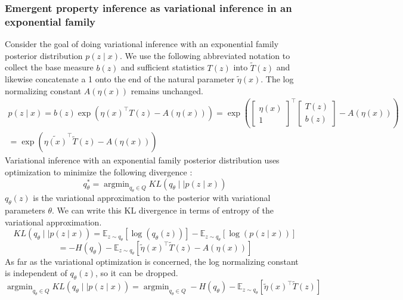 \documentclass[11pt]{article}
\DeclareMathOperator*{\argmin}{argmin}
\begin{document}
\subsubsection{Emergent property inference as variational inference in an exponential family}\label{methods_VI}
Consider the goal of doing variational inference with an exponential family posterior distribution $p(z \mid x)$.  We use the following abbreviated notation to collect the base measure $b(z)$ and sufficient statistics $T(z)$ into $\tilde{T}(z)$ and likewise concatenate a 1 onto the end of the natural parameter $\tilde{\eta}(x)$.  The log normalizing constant $A(\eta(x))$ remains unchanged.
\begin{equation}
\begin{split}
p(z \mid x) = b(z) \exp{\left( \eta(x)^\top T(z) - A(\eta(x)) \right)} = \exp{\left( \begin{bmatrix} \eta(x) \\ 1 \end{bmatrix}^\top \begin{bmatrix} T(z) \\ b(z) \end{bmatrix} - A(\eta(x)) \right)} \\= \exp{\left(\tilde{\eta(x)}^\top \tilde{T}(z) - A(\eta(x)) \right)} 
\end{split}
\end{equation}
Variational inference with an exponential family posterior distribution uses optimization to minimize the following divergence \cite{blei2017variational}:
\begin{equation}
q_\theta^* = \argmin_{q_\theta \in Q} KL(q_\theta \mid \mid p(z \mid x))
\end{equation}
$q_\theta(z)$ is the variational approximation to the posterior with variational parameters $\theta$.  We can write this KL divergence in terms of entropy of the variational approximation.
\begin{equation}
KL(q_\theta \mid \mid p(z \mid x)) = \mathbb{E}_{z \sim q_\theta} \left[ \log (q_\theta(z)) \right] - \mathbb{E}_{z \sim q_\theta} \left[ \log (p(z \mid x)) \right]
\end{equation}
\begin{equation}
 = -H(q_\theta) - \mathbb{E}_{z \sim q_\theta} \left[ \tilde{\eta}(x)^\top  \tilde{T}(z) - A(\eta(x)) \right]
\end{equation}
As far as the variational optimization is concerned, the log normalizing constant is independent of $q_\theta(z)$, so it can be dropped. 
\begin{equation}
\argmin_{q_\theta \in Q} KL(q_\theta \mid \mid p(z \mid x)) =  \argmin_{q_\theta \in Q} -H(q_\theta) - \mathbb{E}_{z \sim q_\theta} \left[ \tilde{\eta}(x)^\top  \tilde{T}(z) \right]
\end{equation}
\end{document}
